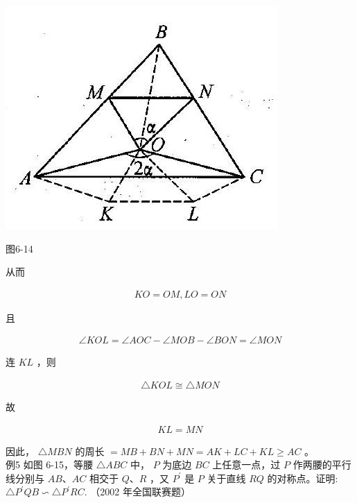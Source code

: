 \documentclass[10pt]{article}
\begin{document}
\begin{center}
\includegraphics[max width=\textwidth]{2024_10_30_2c8f45efd4a519b08e1ag-067}
\end{center}

图6-14

从而

\begin{align*}
K O=O M, L O=O N
\end{align*}

且

\begin{align*}
\angle K O L=\angle A O C-\angle M O B-\angle B O N=\angle M O N
\end{align*}

连 $K L$ ，则

\begin{align*}
\triangle K O L \cong \triangle M O N
\end{align*}

故

\begin{align*}
K L=M N
\end{align*}

因此， $\triangle M B N$ 的周长 $=M B+B N+M N=A K+L C+K L \geqslant A C$ 。\\
例5 如图 6-15，等腰 $\triangle A B C$ 中， $P$ 为底边 $B C$ 上任意一点，过 $P$ 作两腰的平行线分别与 $A B 、 A C$ 相交于 $Q 、 R$ ，又 $P^{\prime}$ 是 $P$ 关于直线 $R Q$ 的对称点。证明: $\triangle P^{\prime} Q B \backsim \triangle P^{\prime} R C$. （2002 年全国联赛题）
\end{document}
